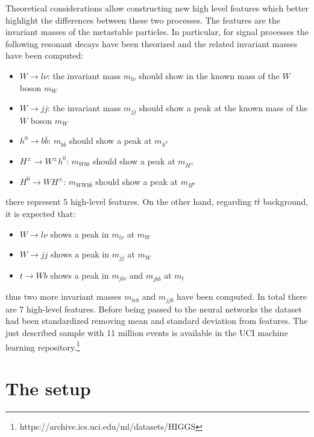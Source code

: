 Theoretical considerations allow constructing new high level features
which better highlight the differences between these two processes.
The features are the invariant masses of the metastable particles.
In particular, for signal processes the following resonant decays have
been theorized and the related invariant masses have been computed:
\begin{itemize}
 \item $W \rightarrow l \nu$: the invariant mass $m_{l\nu}$ should show
       in the known mass of the $W$ boson $m_W$
 \item $W \rightarrow jj$: the invariant mass $m_{jj}$ should show a peak
       at the known mass of the $W$ boson $m_W$
 \item $h^0 \rightarrow b\bar{b}$: $m_{b\bar{b}}$ should show a peak at
       $m_{h^0}$
 \item $H^\pm \rightarrow W^\pm h^0$: $m_{Wbb}$ should show a peak at
       $m_{H^\pm}$
 \item $H^0 \rightarrow WH^\pm$: $m_{WWb\bar{b}}$ should show a peak at
       $m_{H^0}$
\end{itemize}
there represent $5$ high-level features. On the other hand,
regarding $t\bar{t}$ background, it is expected that:
\begin{itemize}
 \item $W \rightarrow l \nu$ shows a peak in $m_{l\nu}$ at $m_W$
 \item $W \rightarrow jj$ shows a peak in $m_{jj}$ at $m_W$
 \item $t \rightarrow Wb$ shows a peak in $m_{jl\nu}$ and $m_{jb\bar{b}}$ at
       $m_t$
\end{itemize}
thus two more invariant masses $m_{l\nu b}$ and $m_{jjb}$ have been
computed. In total there are 7 high-level features. Before being passed to
the neural networks the dataset had been standardized removing mean and
standard deviation from features. The just described sample with 11 million
events is available in the UCI machine learning
repository.\footnote{https://archive.ics.uci.edu/ml/datasets/HIGGS}


\section{The setup}


